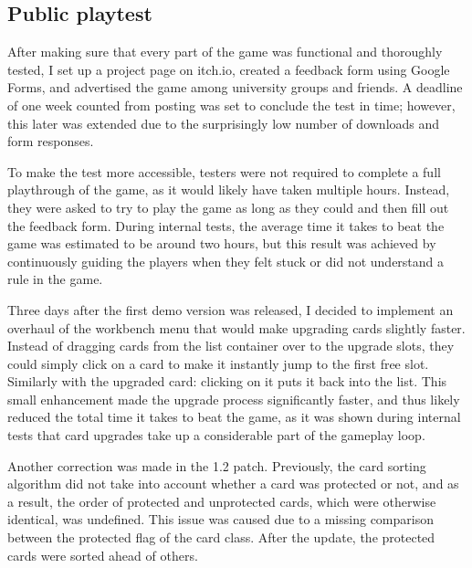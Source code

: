 \subsection{Public playtest}

After making sure that every part of the game was functional and thoroughly tested, I set up a project page on itch.io, created a feedback form using Google Forms, and advertised the game among university groups and friends. A deadline of one week counted from posting was set to conclude the test in time; however, this later was extended due to the surprisingly low number of downloads and form responses.

To make the test more accessible, testers were not required to complete a full playthrough of the game, as it would likely have taken multiple hours. Instead, they were asked to try to play the game as long as they could and then fill out the feedback form. During internal tests, the average time it takes to beat the game was estimated to be around two hours, but this result was achieved by continuously guiding the players when they felt stuck or did not understand a rule in the game.

Three days after the first demo version was released, I decided to implement an overhaul of the workbench menu that would make upgrading cards slightly faster. Instead of dragging cards from the list container over to the upgrade slots, they could simply click on a card to make it instantly jump to the first free slot. Similarly with the upgraded card: clicking on it puts it back into the list. This small enhancement made the upgrade process significantly faster, and thus likely reduced the total time it takes to beat the game, as it was shown during internal tests that card upgrades take up a considerable part of the gameplay loop.

Another correction was made in the 1.2 patch. Previously, the card sorting algorithm did not take into account whether a card was protected or not, and as a result, the order of protected and unprotected cards, which were otherwise identical, was undefined. This issue was caused due to a missing comparison between the protected flag of the card class. After the update, the protected cards were sorted ahead of others.